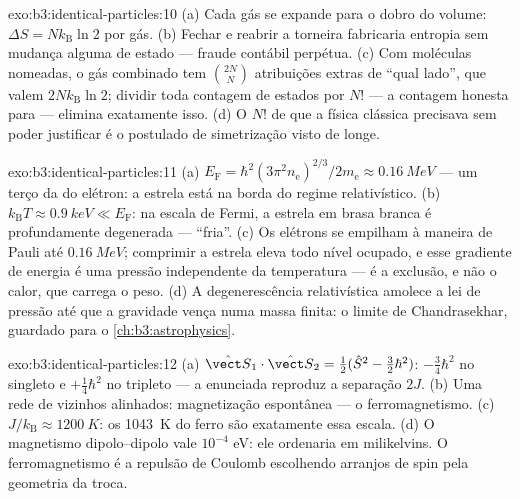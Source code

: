 \begin{solution}{exo:b3:identical-particles:10}
(a) Cada gás se expande para o dobro do volume: $\Delta S =
Nk_{\text{B}}\ln2$ por gás. (b) Fechar e reabrir a torneira fabricaria
entropia sem mudança alguma de estado --- fraude contábil perpétua. (c)
Com moléculas nomeadas, o gás combinado tem $\binom{2N}{N}$ atribuições
extras de ``qual lado'', que valem $2Nk_{\text{B}}\ln2$; dividir toda
contagem de estados por $N!$ --- a contagem honesta para  --- elimina exatamente isso.
(d) O $N!$ de que a física clássica precisava sem poder justificar é o
postulado de simetrização visto de longe.
\end{solution}

\begin{solution}{exo:b3:identical-particles:11}
(a) $E_{\text{F}} = \hbar^2(3\pi^2n_{\text{e}})^{2/3}/2m_{\text{e}}
\approx \qty{0.16}{MeV}$ --- um terço da  do elétron:
a estrela está na borda do regime relativístico. (b)
$k_{\text{B}}T \approx \qty{0.9}{keV} \ll E_{\text{F}}$: na escala de
Fermi, a estrela em brasa branca é profundamente degenerada ---
``fria''. (c) Os elétrons se empilham à maneira de Pauli até
$\qty{0.16}{MeV}$; comprimir a estrela eleva todo nível ocupado, e esse
gradiente de energia é uma pressão independente da temperatura --- é a
exclusão, e não o calor, que carrega o peso. (d) A degenerescência
relativística amolece a lei de pressão até que a gravidade vença numa
massa finita: o limite de Chandrasekhar, guardado para o
\cref{ch:b3:astrophysics}.
\end{solution}

\begin{solution}{exo:b3:identical-particles:12}
(a) $\hat{\vect S}_1\cdot\hat{\vect S}_2 = \tfrac12(\hat S^2 -
\tfrac32\hbar^2)$: $-\tfrac34\hbar^2$ no singleto e
$+\tfrac14\hbar^2$ no tripleto --- a  enunciada reproduz a
separação $2J$. (b) Uma rede de vizinhos alinhados: magnetização
espontânea --- o ferromagnetismo. (c) $J/k_{\text{B}}
\approx \qty{1200}{K}$: os \qty{1043}{K} do ferro são exatamente essa
escala. (d) O magnetismo dipolo--dipolo vale $10^{-4}$ eV: ele
ordenaria em milikelvins. O ferromagnetismo é a repulsão de Coulomb
escolhendo arranjos de spin pela geometria da troca.
\end{solution}

